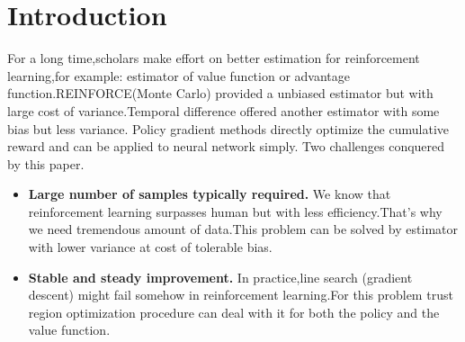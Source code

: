 \section{Introduction}
\label{section:intro}
For a long time,scholars make effort on better estimation for reinforcement learning,for example:
estimator of value function or advantage function.REINFORCE(Monte Carlo) provided a unbiased estimator but with large cost of variance.Temporal difference offered another estimator with some bias but less variance.
Policy gradient methods directly optimize the cumulative reward and can be applied to neural network simply.
Two challenges conquered by this paper.
\begin{itemize}
    \item {\bf Large number of samples typically required.}\newline
          {\hspace{1cm}We know that reinforcement learning surpasses human but with less efficiency.That's why we need tremendous amount of data.This problem can be
          solved by estimator with lower variance at cost of tolerable bias.\hfill}
    \item {\bf Stable and steady improvement.}\newline
          {\hspace{1cm}In practice,line search (gradient descent) might fail somehow in reinforcement learning.For this problem trust region optimization procedure can deal with it for both the policy and the value function.\hfill}          

\end{itemize}